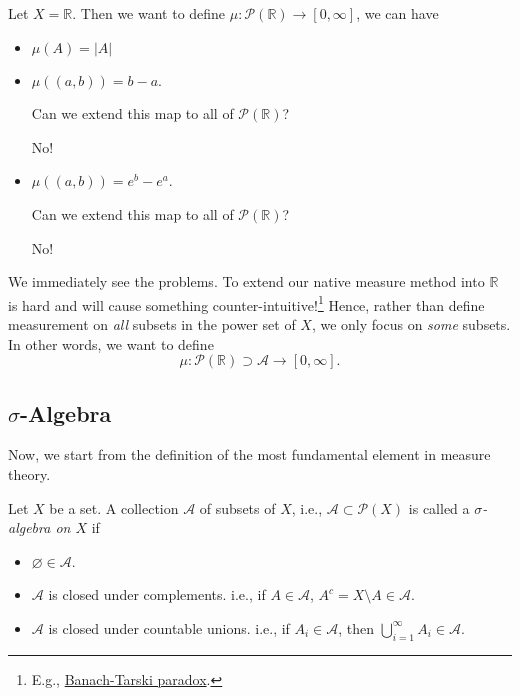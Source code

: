 \begin{eg}
	Let \(X = \mathbb{R} \). Then we want to define \(\mu\colon \mathcal{P}(\mathbb{R} )\to [0, \infty] \), we can have
	\begin{itemize}
		\item \(\mu(A) = \vert A \vert \)
		\item \(\mu(\left(a, b\right)) = b-a\).
		      \begin{problem*}
			      Can we extend this map to all of \(\mathcal{P}(\mathbb{R} )\)?
		      \end{problem*}
		      \begin{answer}
			      No!
		      \end{answer}
		\item \(\mu(\left(a, b\right)) = e^b - e^a\).
		      \begin{problem*}
			      Can we extend this map to all of \(\mathcal{P}(\mathbb{R} )\)?
		      \end{problem*}
		      \begin{answer}
			      No!
		      \end{answer}
	\end{itemize}
\end{eg}

We immediately see the problems. To extend our native measure method into \(\mathbb{R} \) is hard and will cause something counter-intuitive!\footnote{E.g., \href{https://en.wikipedia.org/wiki/Banach-Tarski_paradox}{Banach-Tarski paradox}.} Hence, rather than define measurement on \emph{all} subsets in the power set of \(X\), we only focus on \emph{some} subsets. In other words, we want to define
\[
	\mu\colon \mathcal{P}(\mathbb{R} )\supset\mathcal{A} \to [0, \infty].
\]

\subsection{\(\sigma \)-Algebra}
Now, we start from the definition of the most fundamental element in measure theory.
\begin{definition}\label{def:sigma-algebra}
	Let \(X\) be a set. A collection \(\mathcal{A} \) of subsets of \(X\), i.e., \(\mathcal{A}\subset \mathcal{P} (X) \) is called a \emph{\(\sigma\)-algebra on \(X\)} if
	\begin{itemize}
		\item \(\varnothing \in \mathcal{A} \).
		\item \(\mathcal{A} \) is closed under complements. i.e., if \(A\in \mathcal{A} \), \(A^c = X\setminus A\in \mathcal{A} \).
		\item \(\mathcal{A} \) is closed under countable unions. i.e., if \(A_i\in \mathcal{A} \), then \(\bigcup_{i=1}^{\infty} A_{i}\in \mathcal{A} \).
	\end{itemize}
\end{definition}

